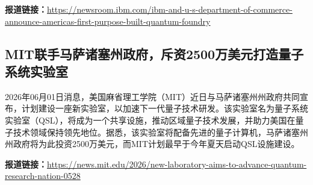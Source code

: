 \documentclass[12pt,a4paper]{ctexart}
\begin{document}
\noindent\textbf{报道链接：}\url{https://newsroom.ibm.com/ibm-and-u-s-department-of-commerce-announce-americas-first-purpose-built-quantum-foundry}

\subsection{ MIT联手马萨诸塞州政府，斥资2500万美元打造量子系统实验室 }

2026年06月01日消息，美国麻省理工学院（MIT）近日与马萨诸塞州州政府共同宣布，计划建设一座新实验室，以加速下一代量子技术研发。该实验室名为量子系统实验室（QSL），将成为一个共享设施，推动区域量子技术发展，并助力美国在量子技术领域保持领先地位。据悉，该实验室将配备先进的量子计算机，马萨诸塞州州政府将为此投资2500万美元，而MIT计划最早于今年夏天启动QSL设施建设。

\noindent\textbf{报道链接：}\url{https://news.mit.edu/2026/new-laboratory-aims-to-advance-quantum-research-nation-0528}
\end{document}
